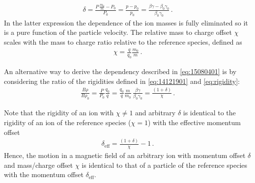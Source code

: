\begin{align}
\delta = \frac{P \, \frac{m_0}{m} - P_0}{P_0} = \frac{p - p_0}{p_0} = \frac{\beta \gamma - \beta_0 \gamma_0}{\beta_0 \gamma_0} \, . \label{eq:15010701}
\end{align}
In the latter expression the dependence of the ion masses is fully eliminated so it is a pure function of the particle velocity. The relative mass to charge offset $\chi$ scales with the mass to charge ratio relative to the reference species, defined as
\begin{align}
\chi =  \frac{q}{q_0}  \frac{m_0}{m}\, .	\label{eq:chidef}
\end{align}

An alternative way to derive the dependency described in \eqref{eq:15080401} is by considering the ratio of the rigidities defined in \eqref{eq:14121901} and \eqref{eq:rigidity}:
\begin{align}
\frac{B \rho}{B \rho_0} = \frac{P}{P_0} \frac{q_0}{q} = \frac{q_0}{q} \frac{m}{m_0} \, \frac{\beta \gamma}{\beta_0 \gamma_0} = \frac{(1+\delta)}{\chi} \, . \label{eq:brho_brho0}
\end{align}

Note that the rigidity of an ion with $\chi \neq 1$ and arbitrary $\delta$ is identical to the rigidity of an ion of the reference species ($\chi=1$) with the effective momentum offset
%
\begin{align}
  \delta_\text{eff} = \frac{(1+\delta)}{\chi} -1 \,. \label{eq:d_effective}
\end{align}
%
Hence, the motion in a magnetic field of an arbitrary ion with momentum offset $\delta$ and mass/charge offset $\chi$ is identical to that of a particle of the reference species with the momentum offset $\delta_\text{eff}$.





